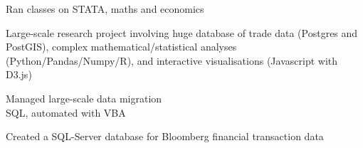 \documentclass[a4paper,nomath]{deedy-resume} %
\begin{document}
\begin{paracol}{2}
\begin{tightitemize}
    \end{tightitemize}
    
    \sectionspace %


    
    \begin{tightitemize}
        \item Ran classes on STATA, maths and economics
        
    \end{tightitemize}
    
    \sectionspace %
    

    \begin{tightitemize}
        \item Large-scale research project involving huge database of trade data (Postgres and PostGIS),
        complex mathematical/statistical analyses (Python/Pandas/Numpy/R), and interactive visualisations (Javascript with D3.js)
    \end{tightitemize}

    \sectionspace %



    \begin{tightitemize}
        \item Managed large-scale data migration \\
        SQL, automated with VBA
        \item Created a SQL-Server database for Bloomberg financial transaction data
    \end{tightitemize}

    \sectionspace %


\end{paracol}
\end{document}
